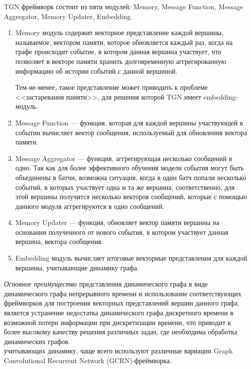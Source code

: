 \documentclass{mipt-thesis-ms}
\begin{document}
TGN фреймворк состоит из пяти модулей: Memory, Message Function, Message Aggregator, Memory Updater, Embedding.
\begin{enumerate}
\item Memory модуль содержит векторное представление каждой вершины, называемое, вектором памяти, которое обновляется каждый раз, когда на графе происходит событие, в котором данная вершина участвует, что позволяет в векторе памяти хранить долговременную аггрегированную информацию об истории событий с данной вершиной.

Тем-не-менее, такое представление может приводить к проблеме <<застаревания памяти>>, для решения которой TGN имеет embedding-модуль.

\item Message Function --- функция, которая для каждой вершины участвующей в событии вычисляет вектор сообщения, используемый для обновления вектора памяти.

\item Message Aggregator --- функция, аггрегирующая несколько сообщений в одно. Так как для более эффективного обучения модели события могут быть объединены в батчи, возможна ситуация, когда в один батч попали несколько событий, в которых участвует одна и та же вершина, соответственно, для этой вершины получится несколько векторов сообщений, которые с помощью данного модуля аггрегируются в одно сообщений.

\item Memory Updater --- функция, обновляет вектор памяти вершины на основании полученного от нового события, в котором участвует данная вершина, вектора сообщения.

\item Embedding модуль вычисляет итоговые векторные представления для каждой вершины, учитывающие динамику графа.
\end{enumerate}

{\it Основное преимущество} представления динамического графа в виде динамического графа непрерывного времени и использование соответствующих фреймворков для построения векторных представлений вершин данного графа, является устранение недостатка динамического графа дискретного времени в возможной потери информации при дискретизации времени, что приводит к более высокому качеству решения различных задач, где необходима обработка динамических графов.\\

учитывающих динамику, чаще всего используют различные вариации Graph Convolutional Recurrent Network (GCRN)-фреймворка.\\
\end{document}
